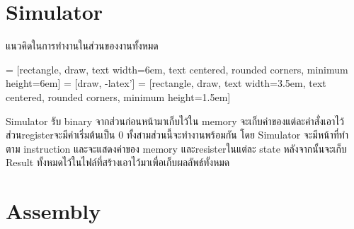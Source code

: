 \documentclass[14pt]{article}
\begin{document}
\section{Simulator}
แนวคิดในการทำงานในส่วนของงานทั้งหมด
\\
\begin{center}
     = [rectangle, draw, 
        text width=6em, text centered, rounded corners, minimum height=6em]
     = [draw, -latex']
     = [rectangle, draw, 
        text width=3.5em, text centered, rounded corners, minimum height=1.5em]
\end{center}
\begin{flushleft}
Simulator รับ binary จากส่วนก่อนหน้ามาเก็บไว้ใน memory จะเก็บค่าของแต่ละคำสั่งเอาไว้ ส่วนregisterจะมีค่าเริ่มต้นเป็น 0
ทั้งสามส่วนนี้จะทำงานพร้อมกัน โดย Simulator จะมีหน้าที่ทำตาม instruction และจะแสดงค่าของ memory และresisterในแต่ละ state
หลังจากนั้นจะเก็บ Result ทั้งหมดไว้ในไฟล์ที่สร้างเอาไว้มาเพื่อเก็บผลลัพธ์ทั้งหมด
\end{flushleft}

\newpage
\section{Assembly}
\end{document}
